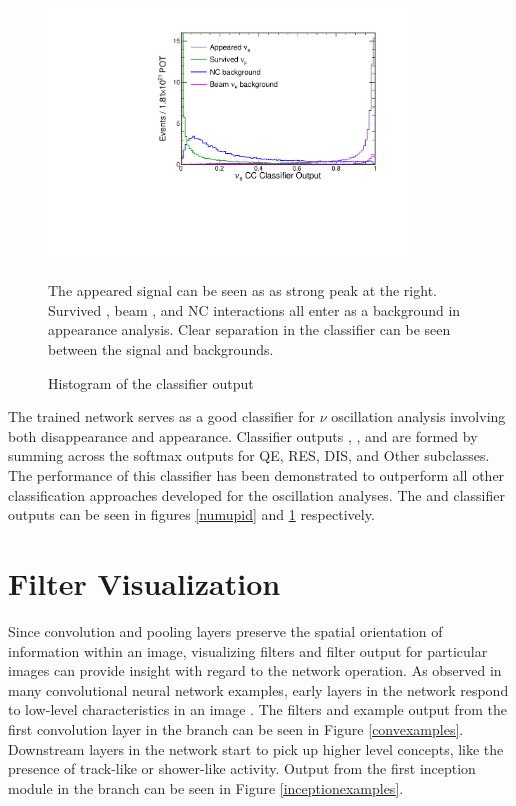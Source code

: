 \begin{figure}[t]
\begin{center}
\includegraphics[width=0.85\textwidth]{figures/cnn/nue_pid_dist.pdf}
\end{center}
\caption{Histogram of the \numu classifier output}{
The appeared \nue signal can be seen as as strong peak at the right.
Survived \numu, beam \nue, and NC interactions all enter as a background
in \nue appearance analysis.
Clear separation in the classifier can be seen between the signal and backgrounds.
}
\label{nuepid}
\end{figure}


The trained network serves as a good classifier for $\nu$ oscillation analysis
involving both \numu disappearance and \nue appearance.
Classifier outputs \nue, \numu, and \nutau are formed by summing across the
softmax outputs for QE, RES, DIS, and Other subclasses.
The performance of this classifier has been demonstrated to outperform
all other classification approaches developed for the \nova oscillation
analyses.
The \numu and \nue classifier outputs can be seen in figures \ref{numupid} and
\ref{nuepid} respectively.


\section{Filter Visualization}

Since convolution and pooling layers preserve the spatial orientation of
information within an image, visualizing filters and filter output for
particular images can provide insight with regard to the network operation.
As observed in many convolutional neural network examples,
early layers in the network respond to low-level characteristics
in an image \cite{lecun2015deep}.
The filters and example output from the first convolution layer in the \yview
branch can be seen in Figure \ref{convexamples}.
Downstream layers in the network start to pick up higher level concepts,
like the presence of track-like or shower-like activity.
Output from the first inception module in the \yview branch can be seen
in Figure \ref{inceptionexamples}.



